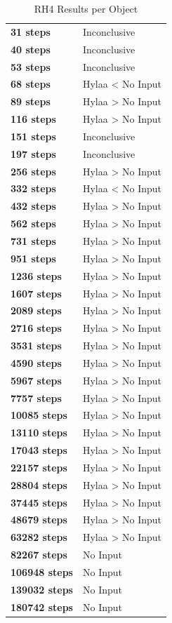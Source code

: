 \documentclass{article}\usepackage[]{graphicx}\usepackage[]{color}
\begin{document}
	
	\begin{table}[H]
	\centering
	\caption{RH4 Results per Object}
	\begin{tabular}{ll}
	\textbf{31 steps} & Inconclusive \\
	\textbf{40 steps} & Inconclusive \\
	\textbf{53 steps} & Inconclusive \\
	\textbf{68 steps} & Hylaa \textless{} No Input \\
	\textbf{89 steps} & Hylaa \textgreater{} No Input \\
	\textbf{116 steps} & Hylaa \textgreater{} No Input \\
	\textbf{151 steps} & Inconclusive \\
	\textbf{197 steps} & Inconclusive \\
	\textbf{256 steps} & Hylaa \textgreater{} No Input \\
	\textbf{332 steps} & Hylaa \textless{} No Input \\
	\textbf{432 steps} & Hylaa \textgreater{} No Input \\
	\textbf{562 steps} & Hylaa \textgreater{} No Input \\
	\textbf{731 steps} & Hylaa \textgreater{} No Input \\
	\textbf{951 steps} & Hylaa \textgreater{} No Input \\
	\textbf{1236 steps} & Hylaa \textgreater{} No Input \\
	\textbf{1607 steps} & Hylaa \textgreater{} No Input \\
	\textbf{2089 steps} & Hylaa \textgreater{} No Input \\
	\textbf{2716 steps} & Hylaa \textgreater{} No Input \\
	\textbf{3531 steps} & Hylaa \textgreater{} No Input \\
	\textbf{4590 steps} & Hylaa \textgreater{} No Input \\
	\textbf{5967 steps} & Hylaa \textgreater{} No Input \\
	\textbf{7757 steps} & Hylaa \textgreater{} No Input \\
	\textbf{10085 steps} & Hylaa \textgreater{} No Input \\
	\textbf{13110 steps} & Hylaa \textgreater{} No Input \\
	\textbf{17043 steps} & Hylaa \textgreater{} No Input \\
	\textbf{22157 steps} & Hylaa \textgreater{} No Input \\
	\textbf{28804 steps} & Hylaa \textgreater{} No Input \\
	\textbf{37445 steps} & Hylaa \textgreater{} No Input \\
	\textbf{48679 steps} & Hylaa \textgreater{} No Input \\
	\textbf{63282 steps} & Hylaa \textgreater{} No Input \\
	\textbf{82267 steps} & No Input \\
	\textbf{106948 steps} & No Input \\
	\textbf{139032 steps} & No Input \\
	\textbf{180742 steps} & No Input \\
	\end{tabular}
	\end{table}
\end{document}
